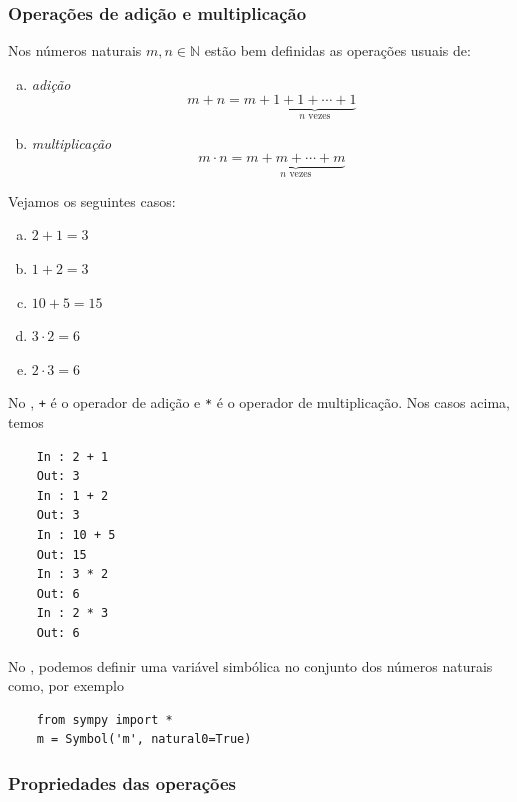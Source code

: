 \subsubsection{Operações de adição e multiplicação}

Nos números naturais $m,n\in\mathbb{N}$ estão bem definidas as operações usuais de:
\begin{enumerate}[a)]
\item \emph{adição}
  \begin{equation}
    m+n = m + \underbrace{1 + 1 + \cdots + 1}_{n\text{ vezes}}
  \end{equation}
\item \emph{multiplicação}
  \begin{equation}
    m\cdot n = \underbrace{m + m + \cdots + m}_{n\text{ vezes}}
  \end{equation}
\end{enumerate}

\begin{ex}
  Vejamos os seguintes casos:
  \begin{enumerate}[a)]
  \item $2 + 1 = 3$
  \item $1 + 2 = 3$
  \item $10 + 5 = 15$
  \item $3\cdot 2 = 6$
  \item $2\cdot 3 = 6$
  \end{enumerate}

  \ifispython
  No \python, \lstinline!+! é o operador de adição e \lstinline!*! é o operador de multiplicação. Nos casos acima, temos
  \begin{lstlisting}
    In : 2 + 1
    Out: 3
    In : 1 + 2
    Out: 3
    In : 10 + 5
    Out: 15
    In : 3 * 2
    Out: 6
    In : 2 * 3
    Out: 6
  \end{lstlisting}
  \fi
\end{ex}

\ifispython
\begin{obs}
  No \python, podemos definir uma variável simbólica no conjunto dos números naturais como, por exemplo
  \begin{lstlisting}
    from sympy import *
    m = Symbol('m', natural0=True)
  \end{lstlisting}
\end{obs}
\fi

\subsubsection{Propriedades das operações}

